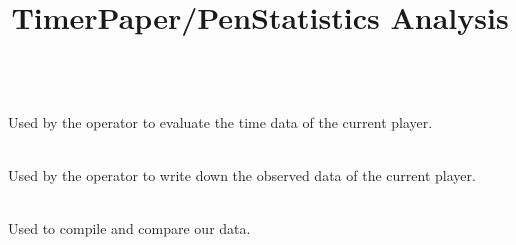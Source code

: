 \documentclass[12pt, openany, twocolumn]{article}
\begin{document}
        \noindent \title{\textbf{Timer}} \\
    Used by the operator to evaluate the time data of the current player. \\

        \noindent \title{\textbf{Paper/Pen}} \\
    Used by the operator to write down the observed data of the current player. \\
    
        \noindent \title{\textbf{Statistics Analysis}} \\
    Used to compile and compare our data.



\end{document}
